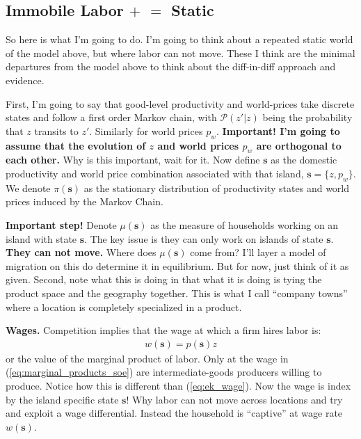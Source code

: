 \documentclass[pdftex,12pt]{article}
\begin{document}
\subsection{Immobile Labor $+$ \citet{eaton2002technology} $=$ Static \citet{lyon2019}}

So here is what I'm going to do. I'm going to think about a repeated static world of the model above, but where labor can not move. These I think are the minimal departures from the model above to think about the diff-in-diff approach and evidence.

\medskip
\noindent First, I'm going to say that good-level productivity and world-prices take discrete states and follow a first order Markov chain, with $\mathcal{P}(z'|z)$ being the probability that $z$ transits to $z'$. Similarly for world prices $p_w$. \textbf{ Important! I'm going to assume that the evolution of $z$ and world prices $p_w$ are orthogonal to each other.} Why is this important, wait for it. Now define $\textbf{s}$ as the domestic productivity and world price combination associated with that island, $\textbf{s} = \{z, p_w\}$. We denote $\pi(\textbf{s})$ as the stationary distribution of productivity states and world prices induced by the Markov Chain.

\medskip
\noindent \textbf{Important step!} Denote $\mu(\textbf{s})$ as the measure of households working on an island with state $\textbf{s}$. The key issue is they can only work on islands of state $\textbf{s}$. \textbf{They can not move.} Where does $\mu(\textbf{s})$ come from? I'll layer a model of migration on this do determine it in equilibrium. But for now, just think of it as given. Second, note what this is doing in that what it is doing is tying the product space and the geography together. This is what I call ``company towns'' where a location is completely specialized in a product.

\medskip
\noindent \textbf{Wages.} Competition implies that the wage at which a firm hires labor is:
\begin{align}
w(\textbf{s}) = p(\textbf{s}) z
\label{eq:marginal_products_soe}
\end{align}
or the value of the marginal product of labor. Only at the wage in (\ref{eq:marginal_products_soe}) are intermediate-goods producers willing to produce. Notice how this is different than (\ref{eq:ek_wage}). Now the wage is index by the island specific state $\textbf{s}$! Why labor can not move across locations and try and exploit a wage differential. Instead the household is ``captive'' at wage rate $w(\textbf{s})$.
\end{document}

